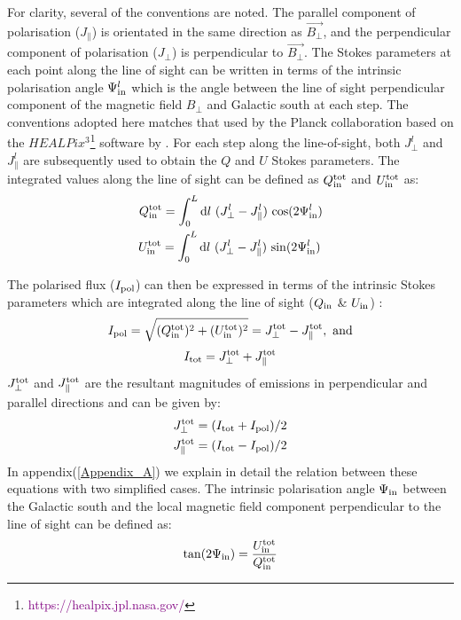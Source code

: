 \documentclass[12pt, a4 paper]{article}
\begin{document}
For clarity, several of the conventions are noted. The parallel component of polarisation (${J_{\parallel}}$) is orientated in the same direction as  $\vec{B_{\perp}}$, and the perpendicular component of polarisation (${J_{\perp}}$) is perpendicular to $\vec{B_{\perp}}$. The Stokes parameters at each point along the line of sight can be written in terms of the intrinsic polarisation angle $\Psi^l_{\rm in}$ which is the angle between the line of sight perpendicular component of the magnetic field $B_{\perp}$ and Galactic south at each step. The conventions adopted here matches that used by the Planck collaboration \cite{Planck_XIX} based on the $HEALPix^3$\footnote{\textcolor{purple}{https://healpix.jpl.nasa.gov/}} software by \cite{Healpix_2005}. For each step along the line-of-sight, both  ${J_{\perp}^l}$ and ${J_{\parallel}^l}$ are subsequently used to obtain the $Q$ and $U$ Stokes parameters. The integrated values along the line of sight can be defined as  $Q^{\rm tot}_{\rm in}$ and $U^{\rm tot}_{\rm in}$ as:
\begin{eqnarray}
Q_{\rm in}^{\rm tot} = {\int_0^L \mathrm{d}l \ ({J_{\perp}^l} - J_{\parallel}^l) \ {\cos}(2\Psi^l_{\rm in}) } \\
U_{\rm in}^{\rm tot} = {\int_0^L \mathrm{d}l \ ({J_{\perp}^l} - J_{\parallel}^l) \ {\sin}(2\Psi^l_{\rm in})} \,
\end{eqnarray}


The polarised flux ($I_{\rm pol}$) can then be expressed in terms of the intrinsic Stokes parameters which are integrated along the line of sight (${Q_{\rm in}}$ \& ${U_{\rm in}}$) :
\begin{eqnarray} \label{eq_I_pol}
I_{\rm pol} = \sqrt{(Q_{\rm in}^{\rm tot})^2+(U_{\rm in}^{\rm tot})^2} = J_{\perp}^{\rm tot} - J_{\parallel}^{\rm tot} ,\ \rm and
\end{eqnarray}
\begin{equation} \label{eq_I_tot}
    I_{\rm tot} = J_{\perp}^{\rm tot} + J_{\parallel}^{\rm tot} 
\end{equation}
$J_{\perp}^{\rm tot}$ and $J_{\parallel}^{\rm tot}$ are the resultant magnitudes of emissions in perpendicular and parallel directions and can be given by:
\begin{eqnarray}
J_{\perp}^{\rm tot} = (I_{\rm tot} + I_{\rm pol})/2 \\
J_{\parallel}^{\rm tot} = (I_{\rm tot} - I_{\rm pol})/2 
\end{eqnarray}
In appendix(\ref{Appendix_A}) we explain in detail the relation between these equations with two simplified cases.
The intrinsic polarisation angle $\Psi_{\rm in}$ between the Galactic south and the local magnetic field component perpendicular to the line of sight can be defined as:
\begin{eqnarray}
\tan(2\Psi_{\rm in}) = \frac{U_{\rm in}^{\rm tot}}{Q_{\rm in}^{\rm tot}} 
\end{eqnarray}
\end{document}
